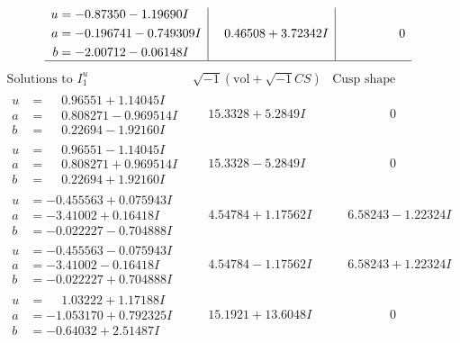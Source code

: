 \documentclass[1p]{elsarticle_modified}
\theoremstyle{definition}
\newcommand{\I}{\sqrt{-1}}
\begin{document}
$$\begin{array}{c|c|c}
\begin{aligned}
u &= -0.87350 - 1.19690 I \\
a &= -0.196741 - 0.749309 I \\
b &= -2.00712 - 0.06148 I\end{aligned}
 & \phantom{-}0.46508 + 3.72342 I & \phantom{-0.000000 } 0\\
 \hline 
 \end{array}$$\newpage$$\begin{array}{c|c|c}  
\text{Solutions to }I^u_{1}& \I (\text{vol} + \sqrt{-1}CS) & \text{Cusp shape}\\
 \hline 
\begin{aligned}
u &= \phantom{-}0.96551 + 1.14045 I \\
a &= \phantom{-}0.808271 - 0.969514 I \\
b &= \phantom{-}0.22694 - 1.92160 I\end{aligned}
 & \phantom{-}15.3328 + 5.2849 I & \phantom{-0.000000 } 0 \\ \hline\begin{aligned}
u &= \phantom{-}0.96551 - 1.14045 I \\
a &= \phantom{-}0.808271 + 0.969514 I \\
b &= \phantom{-}0.22694 + 1.92160 I\end{aligned}
 & \phantom{-}15.3328 - 5.2849 I & \phantom{-0.000000 } 0 \\ \hline\begin{aligned}
u &= -0.455563 + 0.075943 I \\
a &= -3.41002 + 0.16418 I \\
b &= -0.022227 - 0.704888 I\end{aligned}
 & \phantom{-}4.54784 + 1.17562 I & \phantom{-}6.58243 - 1.22324 I \\ \hline\begin{aligned}
u &= -0.455563 - 0.075943 I \\
a &= -3.41002 - 0.16418 I \\
b &= -0.022227 + 0.704888 I\end{aligned}
 & \phantom{-}4.54784 - 1.17562 I & \phantom{-}6.58243 + 1.22324 I \\ \hline\begin{aligned}
u &= \phantom{-}1.03222 + 1.17188 I \\
a &= -1.053170 + 0.792325 I \\
b &= -0.64032 + 2.51487 I\end{aligned}
 & \phantom{-}15.1921 + 13.6048 I & \phantom{-0.000000 } 0 \\ \hline\begin{aligned}

\end{aligned}
\end{array}$$
\end{document}
